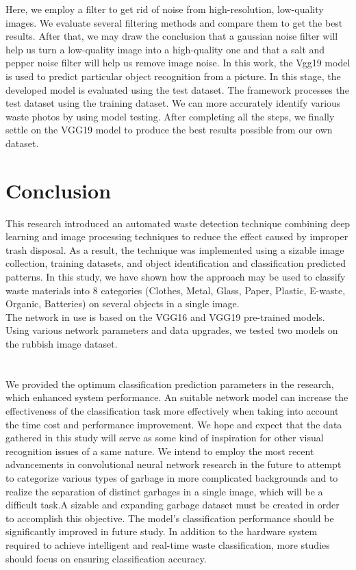 \documentclass[conference]{IEEEtran}
\begin{document}
\begin{table*}[t]
Here, we employ a filter to get rid of noise from high-resolution, low-quality images. We evaluate several filtering methods and compare them to get the best results. After that, we may draw the conclusion that a gaussian noise filter will help us turn a low-quality image into a high-quality one and that a salt and pepper noise filter will help us remove image noise.
In this work, the Vgg19 model is used to predict particular object recognition from a picture. In this stage, the developed model is evaluated using the test dataset. The framework processes the test dataset using the training dataset. We can more accurately identify various waste photos by using model testing.
After completing all the steps, we finally settle on the VGG19 model to produce the best results possible from our own dataset.

\section{Conclusion}
This research introduced an automated waste detection technique combining deep learning and image processing techniques to reduce the effect caused by improper trash disposal. As a result, the technique was implemented using a sizable image collection, training datasets, and object identification and classification predicted patterns. In this study, we have shown how the approach may be used to classify waste materials into 8 categories (Clothes, Metal, Glass, Paper, Plastic, E-waste, Organic, Batteries) on several objects in a single image.\vspace{1mm}\\
The network in use is based on the VGG16 and VGG19 pre-trained models. Using various network parameters and data upgrades, we tested two models on the rubbish image dataset.\vspace{13mm}\\\vspace{13mm}\\\vspace{13mm}\\ We provided the optimum classification prediction parameters in the research, which enhanced system performance. An suitable network model can increase the effectiveness of the classification task more effectively when taking into account the time cost and performance improvement. We hope and expect that the data gathered in this study will serve as some kind of inspiration for other visual recognition issues of a same nature. 
We intend to employ the most recent advancements in convolutional neural network research in the future to attempt to categorize various types of garbage in more complicated backgrounds and to realize the separation of distinct garbages in a single image, which will be a difficult task.A sizable and expanding garbage dataset must be created in order to accomplish this objective. The model's classification performance should be significantly improved in future study. In addition to the hardware system required to achieve intelligent and real-time waste classification, more studies should focus on ensuring classification accuracy.


\end{table*}
\end{document}
